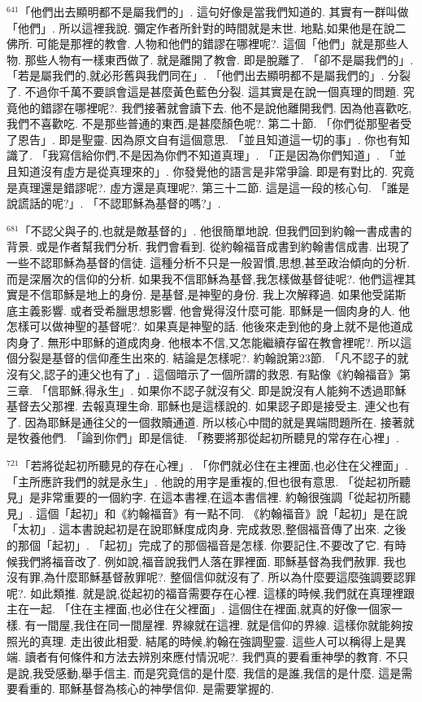 \documentclass{book}
\begin{document}
$^{641}$「他們出去顯明都不是屬我們的」.
這句好像是當我們知道的.
其實有一群叫做「他們」.
所以這裡我說.
彌定作者所針對的時間就是末世.
地點,如果他是在說二佛所.
可能是那裡的教會.
人物和他們的錯謬在哪裡呢?.
這個「他們」就是那些人物.
那些人物有一樣東西做了.
就是離開了教會.
即是脫離了.
「卻不是屬我們的」.
「若是屬我們的,就必形舊與我們同在」.
「他們出去顯明都不是屬我們的」.
分裂了.
不過你千萬不要誤會這是甚麼黃色藍色分裂.
這其實是在說一個真理的問題.
究竟他的錯謬在哪裡呢?.
我們接著就會讀下去.
他不是說他離開我們.
因為他喜歡吃,我們不喜歡吃.
不是那些普通的東西,是甚麼顏色呢?.
第二十節.
「你們從那聖者受了恩告」.
即是聖靈.
因為原文自有這個意思.
「並且知道這一切的事」.
你也有知識了.
「我寫信給你們,不是因為你們不知道真理」.
「正是因為你們知道」.
「並且知道沒有虛方是從真理來的」.
你發覺他的語言是非常爭論.
即是有對比的.
究竟是真理還是錯謬呢?.
虛方還是真理呢?.
第三十二節.
這是這一段的核心句.
「誰是說謊話的呢?」.
「不認耶穌為基督的嗎?」.

$^{681}$「不認父與子的,也就是敵基督的」.
他很簡單地說.
但我們回到約翰一書成書的背景.
或是作者幫我們分析.
我們會看到.
從約翰福音成書到約翰書信成書.
出現了一些不認耶穌為基督的信徒.
這種分析不只是一般習慣,思想,甚至政治傾向的分析.
而是深層次的信仰的分析.
如果我不信耶穌為基督,我怎樣做基督徒呢?.
他們這裡其實是不信耶穌是地上的身份.
是基督,是神聖的身份.
我上次解釋過.
如果他受諾斯底主義影響.
或者受希臘思想影響.
他會覺得沒什麼可能.
耶穌是一個肉身的人.
他怎樣可以做神聖的基督呢?.
如果真是神聖的話.
他後來走到他的身上就不是他道成肉身了.
無形中耶穌的道成肉身.
他根本不信,又怎能繼續存留在教會裡呢?.
所以這個分裂是基督的信仰產生出來的.
結論是怎樣呢?.
約翰說第23節.
「凡不認子的就沒有父,認子的連父也有了」.
這個暗示了一個所謂的救恩.
有點像《約翰福音》第三章.
「信耶穌,得永生」.
如果你不認子就沒有父.
即是說沒有人能夠不透過耶穌基督去父那裡.
去報真理生命.
耶穌也是這樣說的.
如果認子即是接受主.
連父也有了.
因為耶穌是通往父的一個救贖通道.
所以核心中間的就是異端問題所在.
接著就是牧養他們.
「論到你們」即是信徒.
「務要將那從起初所聽見的常存在心裡」.

$^{721}$「若將從起初所聽見的存在心裡」.
「你們就必住在主裡面,也必住在父裡面」.
「主所應許我們的就是永生」.
他說的用字是重複的,但也很有意思.
「從起初所聽見」是非常重要的一個約字.
在這本書裡,在這本書信裡.
約翰很強調「從起初所聽見」.
這個「起初」和《約翰福音》有一點不同.
《約翰福音》說「起初」是在說「太初」.
這本書說起初是在說耶穌度成肉身.
完成救恩,整個福音傳了出來.
之後的那個「起初」.
「起初」完成了的那個福音是怎樣.
你要記住,不要改了它.
有時候我們將福音改了.
例如說,福音說我們人落在罪裡面.
耶穌基督為我們赦罪.
我也沒有罪,為什麼耶穌基督赦罪呢?.
整個信仰就沒有了.
所以為什麼要這麼強調要認罪呢?.
如此類推.
就是說,從起初的福音需要存在心裡.
這樣的時候,我們就在真理裡跟主在一起.
「住在主裡面,也必住在父裡面」.
這個住在裡面,就真的好像一個家一樣.
有一間屋,我住在同一間屋裡.
界線就在這裡.
就是信仰的界線.
這樣你就能夠按照光的真理.
走出彼此相愛.
結尾的時候,約翰在強調聖靈.
這些人可以稱得上是異端.
讀者有何條件和方法去辨別來應付情況呢?.
我們真的要看重神學的教育.
不只是說,我受感動,舉手信主.
而是究竟信的是什麼.
我信的是誰,我信的是什麼.
這是需要看重的.
耶穌基督為核心的神學信仰.
是需要掌握的.
\end{document}
